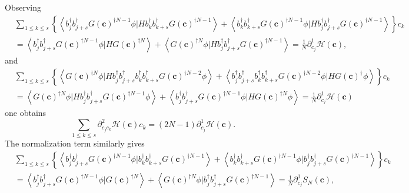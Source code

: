 \documentclass[aps,preprint]{revtex4}%
\begin{document}
Observing
\begin{align}
&  \sum_{1\leq k\leq s}\left\{  \left\langle b_{j}^{\dagger}b_{j+s}^{\dagger
}G\left(  \mathbf{c}\right)  ^{\dagger N-1}\phi|Hb_{k}^{\dagger}%
b_{k+s}^{\dagger}G\left(  \mathbf{c}\right)  ^{\dagger N-1}\right\rangle
+\left\langle b_{k}^{\dagger}b_{k+s}^{\dagger}G\left(  \mathbf{c}\right)
^{\dagger N-1}\phi|Hb_{j}^{\dagger}b_{j+s}^{\dagger}G\left(  \mathbf{c}%
\right)  ^{\dagger N-1}\right\rangle \right\}  c_{k}\nonumber\\
&  =\left\langle b_{j}^{\dagger}b_{j+s}^{\dagger}G\left(  \mathbf{c}\right)
^{\dagger N-1}\phi|HG\left(  \mathbf{c}\right)  ^{\dagger N}\right\rangle
+\left\langle G\left(  \mathbf{c}\right)  ^{\dagger N}\phi|Hb_{j}^{\dagger
}b_{j+s}^{\dagger}G\left(  \mathbf{c}\right)  ^{\dagger N-1}\right\rangle
=\frac{1}{N}\partial_{c_{j}}^{1}\mathcal{H}\left(  \mathbf{c}\right)  ,
\end{align}
and
\begin{align}
&  \sum_{1\leq k\leq s}\left\{  \left\langle G\left(  \mathbf{c}\right)
^{\dagger N}\phi|Hb_{j}^{\dagger}b_{j+s}^{\dagger}b_{k}^{\dagger}%
b_{k+s}^{\dagger}G\left(  \mathbf{c}\right)  ^{\dagger N-2}\phi\right\rangle
+\left\langle b_{j}^{\dagger}b_{j+s}^{\dagger}b_{k}^{\dagger}b_{k+s}^{\dagger
}G\left(  \mathbf{c}\right)  ^{\dagger N-2}\phi|HG\left(  \mathbf{c}\right)
^{\dagger}\phi\right\rangle \right\}  c_{k}\nonumber\\
&  =\left\langle G\left(  \mathbf{c}\right)  ^{\dagger N}\phi|Hb_{j}^{\dagger
}b_{j+s}^{\dagger}G\left(  \mathbf{c}\right)  ^{\dagger N-1}\phi\right\rangle
+\left\langle b_{j}^{\dagger}b_{j+s}^{\dagger}G\left(  \mathbf{c}\right)
^{\dagger N-1}\phi|HG\left(  \mathbf{c}\right)  ^{\dagger N}\phi\right\rangle
=\frac{1}{N}\partial_{c_{j}}^{1}\mathcal{H}\left(  \mathbf{c}\right)
\end{align}
one obtains
\begin{equation}
\sum_{1\leq k\leq s}\partial_{c_{j}c_{k}}^{2}\mathcal{H}\left(  \mathbf{c}%
\right)  c_{k}=\left(  2N-1\right)  \partial_{c_{j}}^{1}\mathcal{H}\left(
\mathbf{c}\right)  .
\end{equation}
The normalization term similarly gives
\begin{align}
&  \sum_{1\leq k\leq s}\left\{  \left\langle b_{j}^{\dagger}b_{j+s}^{\dagger
}G\left(  \mathbf{c}\right)  ^{\dagger N-1}\phi|b_{k}^{\dagger}b_{k+s}%
^{\dagger}G\left(  \mathbf{c}\right)  ^{\dagger N-1}\right\rangle
+\left\langle b_{k}^{\dagger}b_{k+s}^{\dagger}G\left(  \mathbf{c}\right)
^{\dagger N-1}\phi|b_{j}^{\dagger}b_{j+s}^{\dagger}G\left(  \mathbf{c}\right)
^{\dagger N-1}\right\rangle \right\}  c_{k}\nonumber\\
&  =\left\langle b_{j}^{\dagger}b_{j+s}^{\dagger}G\left(  \mathbf{c}\right)
^{\dagger N-1}\phi|G\left(  \mathbf{c}\right)  ^{\dagger N}\right\rangle
+\left\langle G\left(  \mathbf{c}\right)  ^{\dagger N}\phi|b_{j}^{\dagger
}b_{j+s}^{\dagger}G\left(  \mathbf{c}\right)  ^{\dagger N-1}\right\rangle
=\frac{1}{N}\partial_{c_{j}}^{1}S_{N}\left(  \mathbf{c}\right)  ,
\end{align}
\end{document}
